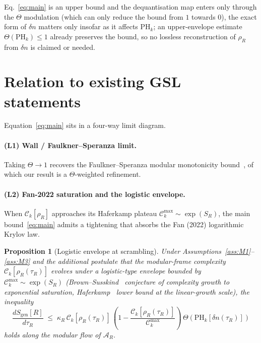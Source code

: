\documentclass[aps,prd,superscriptaddress,nofootinbib,floatfix,10pt]{revtex4-2}
\newtheorem{proposition}{Proposition}
\theoremstyle{remark}
\newcommand{\Sgen}{S_{\mathrm{gen}}}
\newcommand{\tauR}{\tau_{R}}
\newcommand{\kR}{\kappa_{R}}
\newcommand{\Ck}{\mathcal{C}_{k}}
\newcommand{\PHk}{\mathrm{PH}_{k}}
\newcommand{\dn}{\delta n}
\newcommand{\AR}{\mathcal{A}_{R}}
\begin{document}
Eq.~\eqref{eq:main} is an upper bound and the dequantisation map enters
only through the $\Theta$ modulation (which can only reduce the bound
from $1$ towards $0$), the exact form of $\dn$ matters only insofar as
it affects $\PHk$; an upper-envelope estimate $\Theta(\PHk) \le 1$
already preserves the bound, so no lossless reconstruction of
$\rho_{R}$ from $\dn$ is claimed or needed.

\section{Relation to existing GSL statements}
\label{sec:relation}

Equation~\eqref{eq:main} sits in a four-way limit diagram.

\paragraph{(L1) Wall / Faulkner--Speranza limit.}
Taking $\Theta\to 1$ recovers the Faulkner--Speranza
modular monotonicity bound~\cite{FaulknerSperanza2024}, of which our
result is a $\Theta$-weighted refinement.

\paragraph{(L2) Fan-2022 saturation and the logistic envelope.}
When $\Ck[\rho_{R}]$ approaches its Haferkamp plateau
$\Ck^{\max}\sim\exp(S_{R})$, the main bound~\eqref{eq:main} admits a
tightening that absorbs the Fan (2022) logarithmic Krylov law.

\begin{proposition}[Logistic envelope at scrambling]
\label{prop:logistic}
Under Assumptions~\ref{ass:M1}--\ref{ass:M3} and the additional
postulate that the modular-frame complexity $\Ck[\rho_{R}(\tauR)]$
evolves under a logistic-type envelope bounded by
$\Ck^{\max}\sim\exp(S_{R})$ (Brown--Susskind~\cite{BrownSusskind2018}
conjecture of complexity growth to exponential saturation,
Haferkamp~\cite{Haferkamp2022} lower bound at the linear-growth scale),
the inequality
\begin{equation}
 \frac{d\Sgen[R]}{d\tauR}
 \;\le\;
 \kR\,\Ck[\rho_{R}(\tauR)]\,
 \left(1-\frac{\Ck[\rho_{R}(\tauR)]}{\Ck^{\max}}\right)
 \,\Theta\!\left(\PHk[\dn(\tauR)]\right)
 \label{eq:logistic}
\end{equation}
holds along the modular flow of $\AR$.
\end{proposition}
\end{document}
